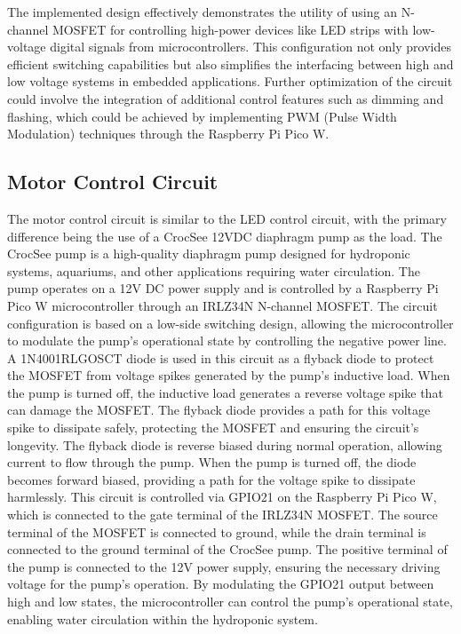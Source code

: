 \documentclass[12pt]{article}
\begin{document}
\newline
\newline
The implemented design effectively demonstrates the utility of using an N-channel MOSFET for controlling high-power devices like LED strips with low-voltage digital signals from microcontrollers. This configuration not only provides efficient switching capabilities but also simplifies the interfacing between high and low voltage systems in embedded applications. Further optimization of the circuit could involve the integration of additional control features such as dimming and flashing, which could be achieved by implementing PWM (Pulse Width Modulation) techniques through the Raspberry Pi Pico W.

\subsection{Motor Control Circuit}
\noindent The motor control circuit is similar to the LED control circuit, with the primary difference being the use of a CrocSee 12VDC diaphragm pump as the load. The CrocSee pump is a high-quality diaphragm pump designed for hydroponic systems, aquariums, and other applications requiring water circulation. The pump operates on a 12V DC power supply and is controlled by a Raspberry Pi Pico W microcontroller through an IRLZ34N N-channel MOSFET. The circuit configuration is based on a low-side switching design, allowing the microcontroller to modulate the pump's operational state by controlling the negative power line.
\newline
\newline
\noindent A 1N4001RLGOSCT diode is used in this circuit as a flyback diode to protect the MOSFET from voltage spikes generated by the pump's inductive load. When the pump is turned off, the inductive load generates a reverse voltage spike that can damage the MOSFET. The flyback diode provides a path for this voltage spike to dissipate safely, protecting the MOSFET and ensuring the circuit's longevity. The flyback diode is reverse biased during normal operation, allowing current to flow through the pump. When the pump is turned off, the diode becomes forward biased, providing a path for the voltage spike to dissipate harmlessly.
\newline
\newline
\noindent This circuit is controlled via GPIO21 on the Raspberry Pi Pico W, which is connected to the gate terminal of the IRLZ34N MOSFET. The source terminal of the MOSFET is connected to ground, while the drain terminal is connected to the ground terminal of the CrocSee pump. The positive terminal of the pump is connected to the 12V power supply, ensuring the necessary driving voltage for the pump's operation. By modulating the GPIO21 output between high and low states, the microcontroller can control the pump's operational state, enabling water circulation within the hydroponic system. 
\end{document}

